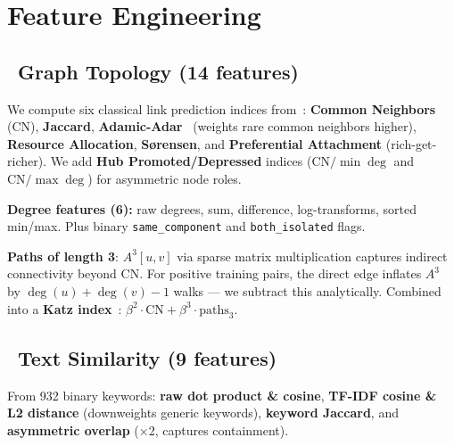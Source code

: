 \documentclass[10pt,a4paper,twocolumn]{article}
\begin{document}
\section{Feature Engineering}

\subsection{~Graph Topology (14 features)}

We compute six classical link prediction indices from~\cite{liben2007}: \textbf{Common Neighbors} (CN), \textbf{Jaccard}, \textbf{Adamic-Adar}~\cite{adamic2003} (weights rare common neighbors higher), \textbf{Resource Allocation}, \textbf{S{\o}rensen}, and \textbf{Preferential Attachment} (rich-get-richer). We add \textbf{Hub Promoted/Depressed} indices ($\text{CN}/\min\deg$ and $\text{CN}/\max\deg$) for asymmetric node roles.

\textbf{Degree features (6):} raw degrees, sum, difference, log-transforms, sorted min/max. Plus binary \texttt{same\_component} and \texttt{both\_isolated} flags.

\begin{insightbox}
\textbf{Paths of length 3}: $A^3[u,v]$ via sparse matrix multiplication captures indirect connectivity beyond CN. For positive training pairs, the direct edge inflates $A^3$ by $\deg(u)+\deg(v)-1$ walks — we subtract this analytically. Combined into a \textbf{Katz index}~\cite{katz1953}: $\beta^2\!\cdot\!\text{CN} + \beta^3\!\cdot\!\text{paths}_3$.
\end{insightbox}

\subsection{~Text Similarity (9 features)}

From 932 binary keywords: \textbf{raw dot product \& cosine}, \textbf{TF-IDF cosine \& L2 distance} (downweights generic keywords), \textbf{keyword Jaccard}, and \textbf{asymmetric overlap} ($\times$2, captures containment).
\end{document}
